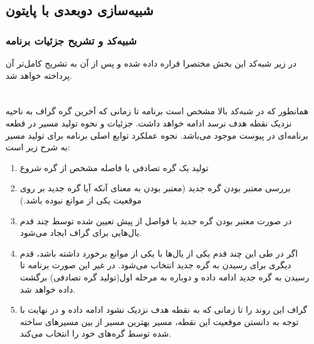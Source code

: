 


\subsection{شبیه‌سازی دوبعدی با پایتون}


\subsubsection{شبیه‌کد و تشریح جزئیات برنامه}
در زیر شبه‌کد این بخش مختصرا قراره داده شده و پس از آن به تشریح کامل‌تر آن پرداخته خواهد شد.
\section*{}
\begin{latin}
	
\end{latin}

همانطور که در شبه‌کد بالا مشخص است برنامه تا زمانی که آخرین گره گراف به ناحیه نزدیک نقطه هدف نرسد ادامه خواهد داشت. جزئیات و نحوه تولید مسیر در قطعه برنامه‌ای در پیوست موجود می‌باشد. نحوه عملکرد توابع اصلی برنامه برای تولید مسیر به شرح زیر است:
\begin{enumerate}
	\item
	تولید یک گره تصادفی با فاصله مشخص از گره شروع
	\item
	بررسی معتبر بودن گره جدید (معتبر بودن به معنای آنکه آیا گره جدید بر روی موقعیت یکی از موانع نبوده باشد.)
	\item
	در صورت معتبر بودن گره جدید با فواصل از پیش تعیین شده توسط چند قدم یال‌هایی برای گراف ایجاد می‌شود.
	\item
	اگر در طی این چند قدم یکی از یال‌ها با یکی از موانع برخورد داشته باشد، قدم دیگری برای رسیدن به گره جدید انتخاب می‌شود. در غیر این صورت برنامه تا رسیدن به گره جدید ادامه داده و دوباره به مرحله اول(تولید گره تصادفی) برگشت داده خواهد شد.
	\item
	گراف این روند را تا زمانی که به نقطه هدف نزدیک نشود ادامه داده و در نهایت با توجه به دانستن موقعیت این نقطه، مسیر بهترین مسیر از بین مسیر‌های ساخته شده توسط گره‌های خود را انتخاب می‌کند.
\end{enumerate}

